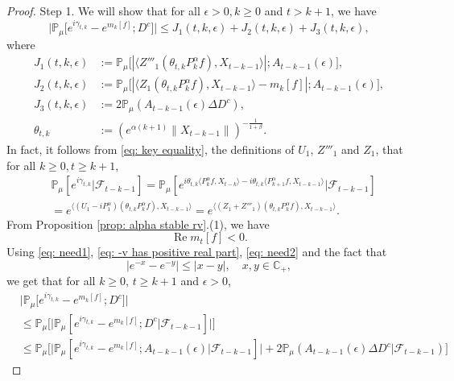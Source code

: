 \documentclass[12pt,a4paper]{amsart}
\theoremstyle{plain}
\theoremstyle{definition}
\numberwithin{equation}{section}
\begin{document}
\begin{proof}
    Step 1. We will show that for all $\epsilon > 0, k\geq 0$ and $t>k+1$, we have
\begin{equation}
    \big|\mathbb{P}_{\mu}\big[e^{i\gamma_{t,k}}-e^{m_k[f]}; D^c\big]\big|
    \leq J_1(t,k,\epsilon)+J_2(t,k,\epsilon)+J_3(t,k,\epsilon),
\end{equation}
    where
\begin{align}
\label{eq: Def of Ji}
    J_1(t,k,\epsilon)
    &:= \mathbb{P}_{\mu}\big[|\langle Z'''_1(\theta_{t,k}P^\alpha_k f), X_{t-k-1}\rangle|; A_{t-k-1}(\epsilon) \big],
    \\ J_2(t,k,\epsilon)
    &:= \mathbb{P}_{\mu}\big[|\langle Z_1(\theta_{t,k}P^\alpha_k f),X_{t-k-1}\rangle-m_k[f]|; A_{t-k-1}(\epsilon)\big],
    \\ J_3(t,k, \epsilon)
    &:=2\mathbb{P}_{\mu}(A_{t-k-1}(\epsilon)\Delta D^c),
    \\\theta_{t,k}
    &:= (e^{\alpha( k+1)}\|X_{t-k-1}\|)^{-\frac{1}{1+\beta}}.
\end{align}
    In fact, it follows from \eqref{eq: key equality}, the definitions of $U_1$, $Z'''_1$ and $Z_1$, that for all $k\geq 0, t\geq k+1$,
\begin{align}
\label{eq: need1}
    &\mathbb{P}_{\mu}[e^{i\gamma_{t,k}}|\mathscr{F}_{t-k-1}]
    =\mathbb{P}_{\mu}[e^{i\theta_{t,k}\langle P^\alpha_k f,X_{t-k}\rangle-i\theta_{t,k}\langle P^\alpha_{k+1} f, X_{t-k-1}\rangle}|\mathscr{F}_{t-k-1}]
    \\&=e^{\langle (U_1 - iP^\alpha_1 ) (\theta_{t,k}P^\alpha_k f),X_{t-k-1}\rangle}
    =e^{\langle (Z_1 + Z'''_1) (\theta_{t,k}P^\alpha_k f),X_{t-k-1}\rangle}.
\end{align}
    From Proposition \ref{prop: alpha stable rv}.(1), we have
\begin{equation}
\label{eq: need2}
    \operatorname {Re} m_t[f] < 0.
\end{equation}
  Using \eqref{eq: need1}, \eqref{eq: -v has positive real part}, \eqref{eq: need2} and the fact that
\[
    |e^{-x} - e^{-y}| \leq |x-y|,\quad x,y \in \mathbb C_+,
\]
    we get that for all $k\geq 0$, $t\geq k+1$ and $\epsilon> 0$,
\begin{align}
\label{eq: inequality that will used later}
    &\big|\mathbb{P}_{\mu}\big[e^{i\gamma_{t,k}}-e^{m_k[f]}; D^c\big]\big|
    \\& \leq \mathbb{P}_{\mu}\Big[\big| \mathbb{P}_{\mu}[e^{i\gamma_{t,k}}-e^{m_k[f]}; D^c | \mathscr F_{t-k-1}]\big|\Big]
    \\& \leq \mathbb{P}_{\mu}\Big[\big| \mathbb{P}_{\mu}[e^{i\gamma_{t,k}}-e^{m_k[f]}; A_{t-k-1}(\epsilon)| \mathscr F_{t-k-1}]\big| + 2\mathbb P_\mu(A_{t-k-1}(\epsilon) \Delta D^c| \mathscr F_{t-k-1})\Big]

\end{align}
\end{proof}
\end{document}

